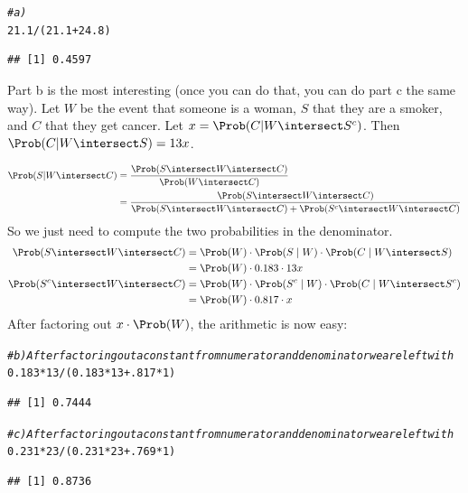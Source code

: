 \documentclass[twoside]{book}\usepackage[]{graphicx}\usepackage[]{xcolor}
\makeatletter
\newcommand{\hlnum}[1]{\textcolor[rgb]{0.686,0.059,0.569}{#1}}%
\newcommand{\hlcom}[1]{\textcolor[rgb]{0.678,0.584,0.686}{\textit{#1}}}%
\newcommand{\hlopt}[1]{\textcolor[rgb]{0,0,0}{#1}}%
\newcommand{\hlstd}[1]{\textcolor[rgb]{0.345,0.345,0.345}{#1}}%
\newenvironment{kframe}{%
 \def\at@end@of@kframe{}%
 \ifinner\ifhmode%
  \def\at@end@of@kframe{\end{minipage}}%
  \begin{minipage}{\columnwidth}%
 \fi\fi%
 \def\FrameCommand##1{\hskip\@totalleftmargin \hskip-\fboxsep
 \colorbox{shadecolor}{##1}\hskip-\fboxsep
     \hskip-\linewidth \hskip-\@totalleftmargin \hskip\columnwidth}%
 \MakeFramed {\advance\hsize-\width
   \@totalleftmargin\z@ \linewidth\hsize
   \@setminipage}}%
 {\par\unskip\endMakeFramed%
 \at@end@of@kframe}
\newenvironment{knitrout}{}{} %
\makeatother
\begin{document}
\begin{solution}
\begin{knitrout}
\color{fgcolor}\begin{kframe}
\begin{alltt}
\hlcom{# a)}
\hlnum{21.1} \hlopt{/} \hlstd{(} \hlnum{21.1} \hlopt{+} \hlnum{24.8}\hlstd{)}
\end{alltt}
\begin{verbatim}
## [1] 0.4597
\end{verbatim}
\end{kframe}
\end{knitrout}
Part b is the most interesting (once you can do that, you can do part c the same way).
Let $W$ be the event that someone is a woman, $S$ that they are a smoker, and $C$ that they
get cancer. Let $x = \Prob( C | W \intersect S^c)$.  Then $\Prob( C | W \intersect S ) = 13x$.

\begin{align*}
	\Prob( S | W \intersect C ) 
	& = \frac{ \Prob(S \intersect W \intersect C) }{\Prob(W \intersect C)}
	\\
	& = \frac{ \Prob(S \intersect W \intersect C) }
	{\Prob(S \intersect W \intersect C) + \Prob( S^c \intersect W \intersect C)}
\end{align*}
So we just need to compute the two probabilities in the denominator.
\begin{align*}
	\Prob(S \intersect W \intersect C)
	&= \Prob(W) \cdot \Prob(S \mid W) \cdot \Prob(C \mid W \intersect S) 
	\\
	&= \Prob(W) \cdot 0.183 \cdot 13x
	\\
	\Prob(S^c \intersect W \intersect C)
	&= \Prob(W) \cdot \Prob(S^c \mid W) \cdot \Prob(C \mid W \intersect S^c) 
	\\
	&= \Prob(W) \cdot 0.817 \cdot x
\end{align*}
After factoring out $x \cdot \Prob(W)$, the arithmetic is now easy:

\begin{knitrout}
\color{fgcolor}\begin{kframe}
\begin{alltt}
\hlcom{# b) After factoring out a constant from numerator and denominator we are left with}
\hlnum{0.183} \hlopt{*} \hlnum{13} \hlopt{/} \hlstd{(} \hlnum{0.183} \hlopt{*} \hlnum{13} \hlopt{+} \hlnum{.817} \hlopt{*} \hlnum{1} \hlstd{)}
\end{alltt}
\begin{verbatim}
## [1] 0.7444
\end{verbatim}
\begin{alltt}
\hlcom{# c) After factoring out a constant from numerator and denominator we are left with}
\hlnum{0.231} \hlopt{*} \hlnum{23} \hlopt{/} \hlstd{(} \hlnum{0.231} \hlopt{*} \hlnum{23} \hlopt{+} \hlnum{.769} \hlopt{*} \hlnum{1} \hlstd{)}
\end{alltt}
\begin{verbatim}
## [1] 0.8736
\end{verbatim}
\end{kframe}
\end{knitrout}


\end{solution}
\end{document}
